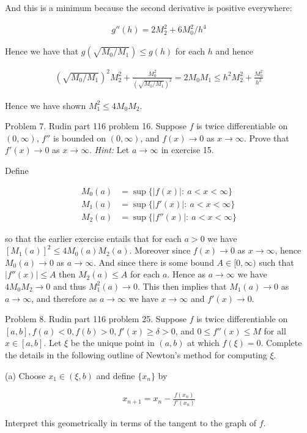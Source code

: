 \documentclass{article}
\begin{document}
  And this is a minimum because the second derivative is positive everywhere:

  \begin{align*}
    g''(h) = 2M_2^2+6M_0^2/h^4
  \end{align*}

  Hence we have that $g(\sqrt{M_0/M_1})\leq g(h)$ for each $h$ and hence

  \begin{align*}
    (\sqrt{M_0/M_1})^2M_2^2 + \frac{M_0^2}{(\sqrt{M_0/M_1})^2} = 2M_0M_1 \leq h^2M_2^2+\frac{M_0^2}{h^2}
  \end{align*}

  Hence we have shown $M_1^2\leq 4M_0M_2$.

  \pagebreak

  {\Large \color{Sepia} Problem 7. Rudin part 116 problem 16. Suppose $f$ is twice differentiable on $(0,\infty)$, $f''$ is bounded on $(0,\infty)$, and $f(x)\to 0$ as $x\to \infty$.  Prove that $f'(x)\to 0$ as $x\to \infty$.  {\it Hint:} Let $a\to \infty$ in exercise 15.}

  \vspace{1cm}

  Define

  \begin{align*}
    M_0(a) &= \sup\{|f(x)|: \ a < x < \infty\} \\
    M_1(a) &= \sup\{|f'(x)|: \ a < x < \infty\} \\
    M_2(a) &= \sup\{|f''(x)|: \ a < x < \infty\}
  \end{align*}

  so that the earlier exercise entails that for each $a>0$ we have $[M_1(a)]^2 \leq 4M_0(a)M_2(a)$.  Moreover since $f(x)\to 0$ as $x\to \infty$, hence $M_0(a)\to 0$ as $a\to \infty$.  And since there is some bound $A\in [0,\infty)$ such that $|f''(x)|\leq A$ then $M_2(a)\leq A$ for each $a$.  Hence as $a\to \infty$ we have $4M_0M_2\to 0$ and thus $M_1^2(a)\to 0$.  This then implies that $M_1(a)\to 0$ as $a\to \infty$, and therefore as $a\to \infty$ we have $x\to \infty$ and $f'(x)\to 0$.

  \pagebreak

  {\Large \color{Sepia} Problem 8. Rudin part 116 problem 25. Suppose $f$ is twice differentiable on $[a,b], f(a)<0, f(b)>0, f'(x)\geq \delta>0$, and $0\leq f''(x)\leq M$ for all $x\in[a,b]$.  Let $\xi$ be the unique point in $(a,b)$ at which $f(\xi)=0.$  Complete the details in the following outline of Newton's method for computing $\xi$.

  (a) Choose $x_1\in (\xi,b)$ and define $\{x_n\}$ by

  \begin{align*}
    x_{n+1}=x_n-\frac{f(x_n)}{f'(x_n)}
  \end{align*}

  Interpret this geometrically in terms of the tangent to the graph of $f$.}
\end{document}
